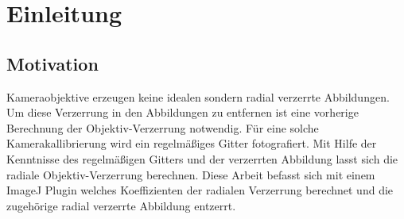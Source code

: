 \section{Einleitung}\label{sec:Introduction}




\subsection{Motivation}\label{sec:Motivation}

Kameraobjektive erzeugen keine idealen sondern radial verzerrte Abbildungen. Um diese Verzerrung in den Abbildungen zu entfernen ist eine vorherige Berechnung der Objektiv-Verzerrung notwendig. Für eine solche Kamerakallibrierung wird ein regelmäßiges Gitter fotografiert. Mit Hilfe der Kenntnisse des regelmäßigen Gitters und der verzerrten Abbildung lasst sich die radiale Objektiv-Verzerrung berechnen. Diese Arbeit befasst sich mit einem ImageJ Plugin welches Koeffizienten der radialen Verzerrung berechnet und die zugehörige radial verzerrte Abbildung entzerrt.






















